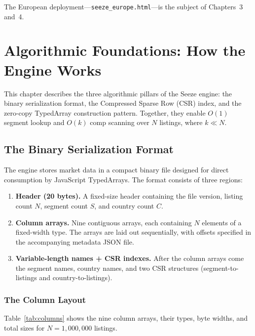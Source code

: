 \documentclass[11pt,a4paper,twoside]{book}
\begin{document}
The European deployment---\texttt{seeze\_europe.html}---is the subject of Chapters~3 and~4.

\chapter{Algorithmic Foundations: How the Engine Works}

This chapter describes the three algorithmic pillars of the Seeze engine: the binary
serialization format, the Compressed Sparse Row (CSR) index, and the zero-copy TypedArray
construction pattern. Together, they enable $O(1)$ segment lookup and $O(k)$ comp scanning
over $N$ listings, where $k \ll N$.

\section{The Binary Serialization Format}

The engine stores market data in a compact binary file designed for direct consumption by
JavaScript TypedArrays. The format consists of three regions:

\begin{enumerate}[leftmargin=*]
    \item \textbf{Header (20 bytes).} A fixed-size header containing the file version,
          listing count $N$, segment count $S$, and country count $C$.
    \item \textbf{Column arrays.} Nine contiguous arrays, each containing $N$ elements of a
          fixed-width type. The arrays are laid out sequentially, with offsets specified in
          the accompanying metadata JSON file.
    \item \textbf{Variable-length names + CSR indexes.} After the column arrays come the
          segment names, country names, and two CSR structures (segment-to-listings and
          country-to-listings).
\end{enumerate}

\subsection{The Column Layout}

Table~\ref{tab:columns} shows the nine column arrays, their types, byte widths, and total
sizes for $N = 1,\!000,\!000$ listings.
\end{document}
